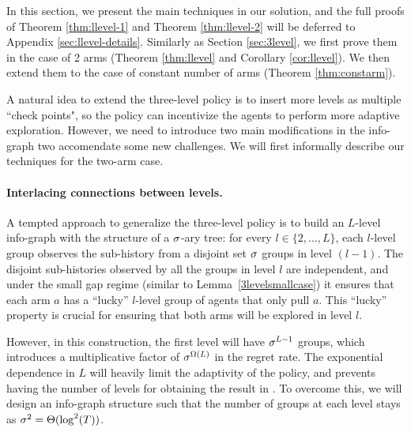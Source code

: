 In this section, we present the main techniques in our solution, and
the full proofs of Theorem \ref{thm:llevel-1} and Theorem
\ref{thm:llevel-2} will be deferred to Appendix
\ref{sec:llevel-details}. Similarly as Section \ref{sec:3level}, we
first prove them in the case of 2 arms (Theorem \ref{thm:llevel} and
Corollary \ref{cor:llevel}). We then extend them to the case of
constant number of arms (Theorem \ref{thm:constarm}).

A natural idea to extend the three-level policy is to insert more
levels as multiple ``check points", so the policy can incentivize the
agents to perform more adaptive exploration. However, we need to
introduce two main modifications in the info-graph two accomendate
some new challenges. We will first informally describe our techniques
for the two-arm case.




\paragraph{Interlacing connections between levels.}A tempted approach
to generalize the three-level policy is to build an $L$-level
info-graph with the structure of a $\sigma$-ary tree: for every
$l\in \{2, \ldots , L\}$, each $l$-level group observes the
sub-history from a disjoint set $\sigma$ groups in level $(l-1)$. The
disjoint sub-histories observed by all the groups in level $l$ are
independent, and under the small gap regime (similar to
Lemma~\ref{3levelsmallcase}) it ensures that each arm $a$ has a
``lucky'' $l$-level group of agents that only pull $a$. This ``lucky''
property is crucial for ensuring that both arms will be explored in
level $l$.

However, in this construction, the first level will have $\sigma^{L-1}$
groups, which introduces a multiplicative factor of $\sigma^{\Omega(L)}$
in the regret rate. The exponential dependence in $L$ will heavily
limit the adaptivity of the policy, and prevents having the number of
levels for obtaining the result in . To overcome
this, we will design an info-graph structure such that the number of
groups at each level stays as $\sigma^2 = \Theta(\log^2(T))$.

